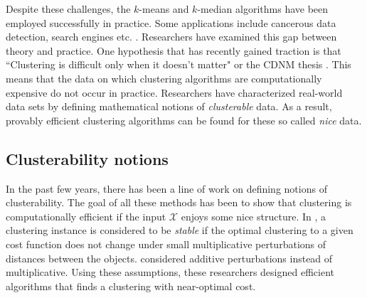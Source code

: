 \documentclass[11pt]{article}
\newcommand{\mc}{\mathcal}
\begin{document}
Despite these challenges, the $k$-means and $k$-median algorithms have been employed successfully in practice. Some applications include cancerous data detection, search engines etc. \cite{wang2005comparison,liu2007clustering}. Researchers have examined this gap between theory and practice. One hypothesis that has recently gained traction is that ``Clustering is difficult only when it doesn't matter" or the CDNM thesis \cite{daniely2012clustering}. This means that the data on which clustering algorithms are computationally expensive do not occur in practice. Researchers have characterized real-world data sets by defining mathematical notions of \textit{clusterable} data. As a result, provably efficient clustering algorithms can be found for these so called {\em nice} data.  

\subsection{Clusterability notions}
\label{subsection:clusterabilitynotion}
In the past few years, there has been a line of work on defining notions of clusterability. The goal of all these methods has been to show that clustering is computationally efficient if the input $\mc X$ enjoys some nice structure. In \cite{bilu2012stable}, a clustering instance is considered to be \emph{stable} if the optimal clustering to a given cost function does not change under small multiplicative perturbations of distances between the objects. \cite{ackerman2009clusterability} considered additive perturbations instead of multiplicative.  Using these assumptions, these researchers designed efficient algorithms that finds a clustering with near-optimal cost. 
\end{document}
